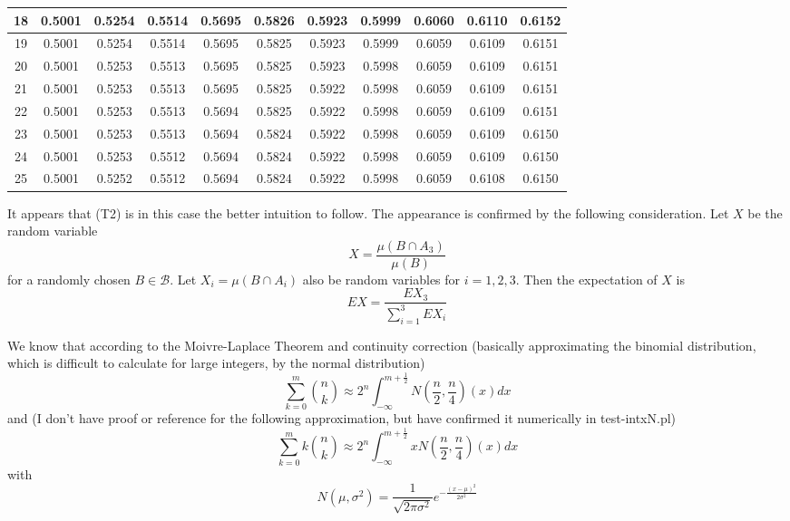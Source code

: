 \documentclass[11pt]{article}
\newcommand{\nootag}{}
\begin{document}
\begin{tabular}{|c|c|c|c|c|c|c|c|c|c|c|}
 \hline 
18 &0.5001 &0.5254 &0.5514 &0.5695 &0.5826 &0.5923 &0.5999 &0.6060 &0.6110 &0.6152 \\
 \hline 
19 &0.5001 &0.5254 &0.5514 &0.5695 &0.5825 &0.5923 &0.5999 &0.6059 &0.6109 &0.6151 \\
 \hline 
20 &0.5001 &0.5253 &0.5513 &0.5695 &0.5825 &0.5923 &0.5998 &0.6059 &0.6109 &0.6151 \\
 \hline 
21 &0.5001 &0.5253 &0.5513 &0.5695 &0.5825 &0.5922 &0.5998 &0.6059 &0.6109 &0.6151 \\
 \hline 
22 &0.5001 &0.5253 &0.5513 &0.5694 &0.5825 &0.5922 &0.5998 &0.6059 &0.6109 &0.6151 \\
 \hline 
23 &0.5001 &0.5253 &0.5513 &0.5694 &0.5824 &0.5922 &0.5998 &0.6059 &0.6109 &0.6150 \\
 \hline 
24 &0.5001 &0.5253 &0.5512 &0.5694 &0.5824 &0.5922 &0.5998 &0.6059 &0.6109 &0.6150 \\
 \hline 
25 &0.5001 &0.5252 &0.5512 &0.5694 &0.5824 &0.5922 &0.5998 &0.6059 &0.6108 &0.6150 \\
 \hline 
\end{tabular}

It appears that (T2) is in this case the better intuition to follow.
The appearance is confirmed by the following consideration. Let $X$ be
the random variable
\begin{equation}
  X=\frac{\mu(B\cap{}A_{3})}{\mu(B)}\nootag
\end{equation}
for a randomly chosen $B\in\mathcal{B}$. Let $X_{i}=\mu(B\cap{}A_{i})$
also be random variables for $i=1,2,3$. Then the expectation of $X$ is
\begin{equation}
  \label{eq:ex}
  EX=\frac{EX_{3}}{\sum_{i=1}^{3}EX_{i}}
\end{equation}

We know that according to the Moivre-Laplace Theorem and continuity
correction (basically approximating the binomial distribution, which
is difficult to calculate for large integers, by the normal
distribution)
\begin{equation}
  \sum_{k=0}^{m}\binom{n}{k}\approx{}2^{n}\int_{-\infty}^{m+\frac{1}{2}}N\left(\frac{n}{2},\frac{n}{4}\right)(x)dx\nootag
\end{equation}
and (I don't have proof or reference for the following approximation,
but have confirmed it numerically in test-intxN.pl)
\begin{equation}
  \sum_{k=0}^{m}k\binom{n}{k}\approx{}2^{n}\int_{-\infty}^{m+\frac{1}{2}}xN\left(\frac{n}{2},\frac{n}{4}\right)(x)dx\nootag
\end{equation}
with
\begin{equation}
  N(\mu,\sigma^{2})=\frac{1}{\sqrt{2\pi\sigma^{2}}}e^{-\frac{(x-\mu)^{2}}{2\sigma^{2}}}
\end{equation}
\end{document}
